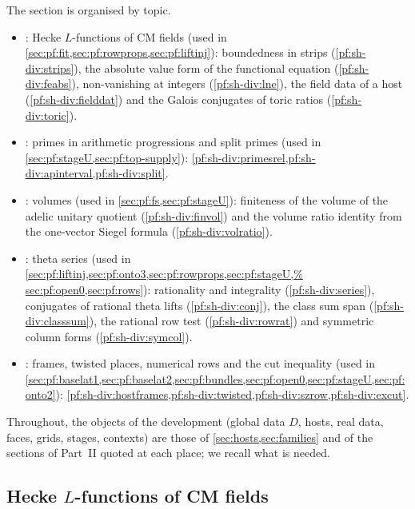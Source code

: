The section is organised by topic.
\begin{itemize}
\item {}: Hecke $L$-functions of CM fields (used in \cref{sec:pf:fit,sec:pf:rowprops,sec:pf:liftinj}):
boundedness in strips (\cref{pf:sh-div:strips}), the absolute value form of the functional equation
(\cref{pf:sh-div:feabs}), non-vanishing at integers (\cref{pf:sh-div:lne}), the field data of a host
(\cref{pf:sh-div:fielddat}) and the Galois conjugates of toric ratios (\cref{pf:sh-div:toric}).
\item {}: primes in arithmetic progressions and split primes (used in
\cref{sec:pf:stageU,sec:pf:top-supply}): \cref{pf:sh-div:primesrel,pf:sh-div:apinterval,pf:sh-div:split}.
\item {}: volumes (used in \cref{sec:pf:fs,sec:pf:stageU}): finiteness of the volume of the
adelic unitary quotient (\cref{pf:sh-div:finvol}) and the volume ratio identity from the one-vector Siegel formula
(\cref{pf:sh-div:volratio}).
\item {}: theta series (used in \cref{sec:pf:liftinj,sec:pf:onto3,sec:pf:rowprops,sec:pf:stageU,%
sec:pf:open0,sec:pf:rows}): rationality and integrality (\cref{pf:sh-div:series}), conjugates of rational theta lifts
(\cref{pf:sh-div:conj}), the class sum span (\cref{pf:sh-div:classsum}), the rational row test
(\cref{pf:sh-div:rowrat}) and symmetric column forms (\cref{pf:sh-div:symcol}).
\item {}: frames, twisted places, numerical rows and the cut inequality (used in
\cref{sec:pf:baselat1,sec:pf:baselat2,sec:pf:bundles,sec:pf:open0,sec:pf:stageU,sec:pf:onto2}):
\cref{pf:sh-div:hostframes,pf:sh-div:twisted,pf:sh-div:szrow,pf:sh-div:excut}.
\end{itemize}
Throughout, the objects of the development (global data $D$, hosts, real data, faces, grids, stages, contexts) are those of
\cref{sec:hosts,sec:families} and of the sections of Part~II quoted at each place; we recall what is needed.

\subsection{Hecke \texorpdfstring{$L$}{L}-functions of CM fields}\label{sec:pf:sh-div:hecke}


